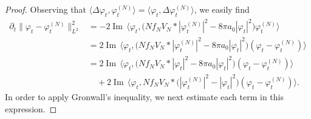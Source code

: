 \documentclass[11pt,a4paper,DIV11]{scrartcl}	%
\renewcommand{\Im}{\operatorname{Im}\,} 	%
\begin{document}
\begin{proof}
  Observing that $\langle \Delta \varphi_t, \varphi_t^{(N)} \rangle = \langle
  \varphi_t, \Delta \varphi_t^{(N)} \rangle$, we easily find
  \begin{equation}\label{ddt}
    \begin{aligned}
      \partial_t \| \varphi_t - \varphi_t^{(N)} \|_{L^2}^2 & = -2 \Im \langle
      \varphi_t, \big(N f_N V_N * |\varphi_t^{(N)}|^2 - 8 \pi a_0 |\varphi_t|^2\big)
      \varphi_t^{(N)} \rangle \\
      & = 2 \Im \langle \varphi_t, \big(N f_N V_N * |\varphi_t^{(N)}|^2 - 8 \pi
      a_0 |\varphi_t|^2\big) (\varphi_t - \varphi_t^{(N)}) \rangle \\
      & = 2 \Im \langle \varphi_t, \big(N f_N V_N * |\varphi_t|^2 - 8 \pi a_0
      |\varphi_t|^2\big) (\varphi_t - \varphi_t^{(N)}) \rangle \\
      & \quad + 2 \Im \langle \varphi_t, N f_N V_N * \big(|\varphi_t^{(N)}|^2 -
      |\varphi_t|^2\big) (\varphi_t - \varphi_t^{(N)}) \rangle.
    \end{aligned}
  \end{equation}
  In order to apply Gronwall's inequality, we next estimate each term in this
  expression.



\end{proof}
\end{document}
